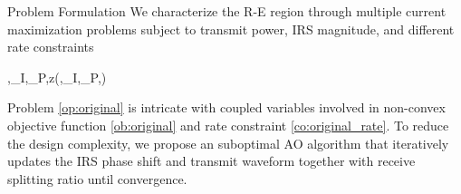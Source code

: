 \documentclass[journal]{IEEEtran}
\begin{document}
\begin{section}{Problem Formulation}
	We characterize the R-E region through multiple current maximization problems subject to transmit power, IRS magnitude, and different rate constraints
	\begin{maxi!}
		{\boldsymbol{\phi},_I,_P,\rho}{z(\boldsymbol{\phi},_I,_P,\rho)}{\label{op:original}}{\label{ob:original}}
		\label{co:original_power}
		\label{co:original_rate}
		\label{co:original_modulus}
	\end{maxi!}
	Problem \ref{op:original} is intricate with coupled variables involved in non-convex objective function \ref{ob:original} and rate constraint \ref{co:original_rate}. To reduce the design complexity, we propose an suboptimal AO algorithm that iteratively updates the IRS phase shift and transmit waveform together with receive splitting ratio until convergence.


\end{section}
\end{document}
